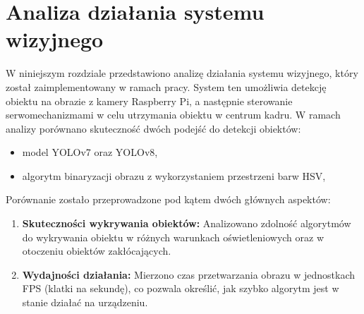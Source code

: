 \documentclass[a4paper,twoside,12pt]{book}
\begin{document}







%      


\chapter{Analiza działania systemu wizyjnego}
\label{ch:05}
W niniejszym rozdziale przedstawiono analizę działania systemu wizyjnego, który został zaimplementowany w ramach pracy. System ten umożliwia detekcję obiektu na obrazie z kamery Raspberry Pi, a następnie sterowanie serwomechanizmami w celu utrzymania obiektu w centrum kadru. W ramach analizy porównano skuteczność dwóch podejść do detekcji obiektów: 
\begin{itemize}
    \item model YOLOv7 oraz YOLOv8,
    \item algorytm binaryzacji obrazu z wykorzystaniem przestrzeni barw HSV,
\end{itemize}

Porównanie zostało przeprowadzone pod kątem dwóch głównych aspektów:
\begin{enumerate}
    \item \textbf{Skuteczności wykrywania obiektów:} Analizowano zdolność algorytmów do wykrywania obiektu w różnych warunkach oświetleniowych oraz w otoczeniu obiektów zakłócających.
    \item \textbf{Wydajności działania:} Mierzono czas przetwarzania obrazu w jednostkach FPS (klatki na sekundę), co pozwala określić, jak szybko algorytm jest w stanie działać na urządzeniu.
\end{enumerate}
\end{document}
